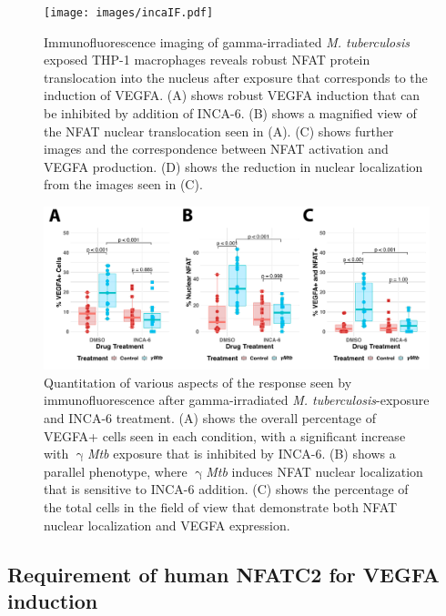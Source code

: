 \begin{figure}
\centering
\texttt{[image: images/incaIF.pdf]}
\caption[Immunofluorescence of $\upgamma$\hyp{}\textit{Mtb}\hyp{}exposed THP\hyp{}1 macrophages]{Immunofluorescence imaging of gamma\hyp{}irradiated \textit{M. tuberculosis} exposed THP\hyp{}1 macrophages reveals robust NFAT protein translocation into the nucleus after exposure that corresponds to the induction of VEGFA. (A) shows robust VEGFA induction that can be inhibited by addition of INCA\hyp{}6. (B) shows a magnified view of the NFAT nuclear translocation seen in (A). (C) shows further images and the correspondence between NFAT activation and VEGFA production. (D) shows the reduction in nuclear localization from the images seen in (C).}
\label{figure:incaif}

\end{figure}

\begin{figure}
\centering
\includegraphics[width=\textwidth]{images/incaIFquant.pdf}
\caption[Quantitation of THP\hyp{}1 macrophage immunofluorescence with NFAT inhibition]{Quantitation of various aspects of the response seen by immunofluorescence after gamma\hyp{}irradiated \textit{M. tuberculosis}\hyp{}exposure and INCA\hyp{}6 treatment. (A) shows the overall percentage of VEGFA+ cells seen in each condition, with a significant increase with $\upgamma$\textit{Mtb} exposure that is inhibited by INCA\hyp{}6. (B) shows a parallel phenotype, where $\upgamma$\textit{Mtb} induces NFAT nuclear localization that is sensitive to INCA\hyp{}6 addition. (C) shows the percentage of the total cells in the field of view that demonstrate both NFAT nuclear localization and VEGFA expression.}
\label{figure:incaquant}
\end{figure}

\subsection{Requirement of human NFATC2 for VEGFA induction}\label{thp1lenti}

